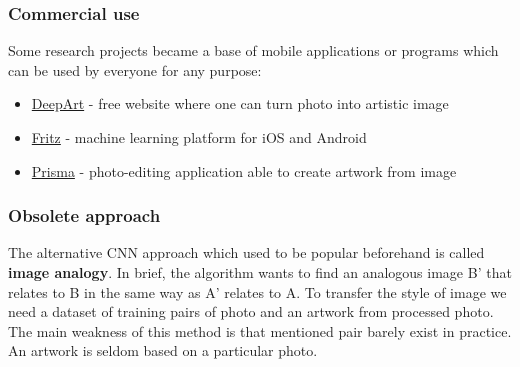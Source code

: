 \documentclass[../Main.tex]{subfiles}
\begin{document}
    
    \subsubsection{Commercial use}
    Some research projects became a base of mobile applications or programs which can be used by everyone for any purpose:
    \begin{itemize}
        \item \href{https://deepart.io}{DeepArt} - free website where one can turn photo into artistic image
        \item \href{https://www.fritz.ai}{Fritz} - machine learning platform for iOS and Android 
        \item \href{https://prisma-ai.com}{Prisma} - photo-editing application able to create artwork from image
    \end{itemize}

    

    
    \subsubsection{Obsolete approach}
    The alternative CNN approach which used to be popular beforehand is called \textbf{image analogy}. In brief, the algorithm wants to find an analogous image B' that relates to B in the same way as A' relates to A.  To transfer the style of image we need a dataset of training pairs of photo and an artwork from processed photo. The main weakness of this method is that mentioned pair barely exist in practice. An artwork is seldom based on a particular photo.
\end{document}
